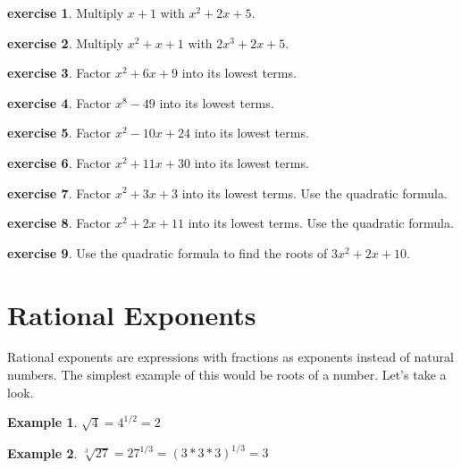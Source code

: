 \documentclass{scrbook}
\theoremstyle{definition}
\newtheorem{example}{Example}
\newtheorem{exercise}{exercise}[subsection]
\begin{document}
\begin{exercise}
  Multiply $x + 1$ with $x^2 + 2x + 5$.
\end{exercise}

\begin{exercise}
  Multiply $x^2 + x + 1$ with $2x^3 + 2x + 5$.
\end{exercise}

\begin{exercise}
  Factor $x^2 + 6x + 9$ into its lowest terms.
\end{exercise}

\begin{exercise}
  Factor $x^8 - 49$ into its lowest terms.
\end{exercise}

\begin{exercise}
  Factor $x^2 - 10x + 24$ into its lowest terms.
\end{exercise}

\begin{exercise}
  Factor $x^2 + 11x + 30$ into its lowest terms.
\end{exercise}

\begin{exercise}
  Factor $x^2 + 3x + 3$ into its lowest terms. Use the quadratic formula. 
\end{exercise}

\begin{exercise}
  Factor $x^2 + 2x + 11$ into its lowest terms. Use the quadratic formula. 
\end{exercise}

\begin{exercise}
  Use the quadratic formula to find the roots of $3x^2 + 2x + 10$.
\end{exercise}

\section{Rational Exponents}

Rational exponents are expressions with fractions as exponents instead of natural numbers. The simplest example of this would be roots of a number. Let's take a look.

\begin{example}
  $\sqrt{4} = 4^{1/2} = 2$
\end{example}

\begin{example}
  $\sqrt[3]{27} = 27^{1/3} = (3 * 3 * 3)^{1/3} = 3$
\end{example}
\end{document}
